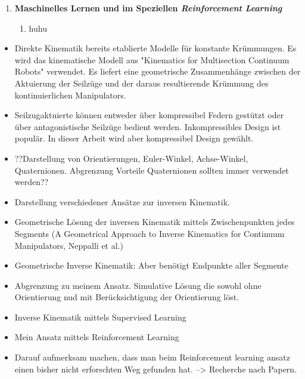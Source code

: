 \begin{enumerate}
\begin{enumerate}
\end{enumerate}
\item \textbf{Maschinelles Lernen und im Speziellen \textit{Reinforcement Learning}}
\begin{enumerate}
\item huhu
\end{enumerate}

\end{enumerate}

\begin{itemize}

\item Direkte Kinematik bereits etablierte Modelle für konstante Krümmungen. Es wird das kinematische Modell aus "Kinematics for Multisection Continuum Robots" verwendet. Es liefert eine geometrische Zusammenhänge zwischen der Aktuierung der Seilzüge und der daraus resultierende Krümmung des kontinuierlichen Manipulators.

\item Seilzugaktuierte können entweder über kompressibel Federn gestützt oder über antagonistische Seilzüge bedient werden. Inkompressibles Design ist populär. In dieser Arbeit wird aber kompressibel Design gewählt.

\item ??Darstellung von Orientierungen, Euler-Winkel, Achse-Winkel, Quaternionen. Abgrenzung Vorteile Quaternionen sollten immer verwendet werden??

\item Darstellung verschiedener Ansätze zur inversen Kinematik. 

\item Geometrische Lösung der inversen Kinematik mittels Zwischenpunkten jedes Segments (A Geometrical Approach to Inverse Kinematics for Continuum Manipulators, Neppalli et al.) \cite{NCJW09}

\item Geometrische Inverse Kinematik: Aber benötigt Endpunkte aller Segmente

\item Abgrenzung zu meinem Ansatz. Simulative Lösung die sowohl ohne Orientierung nud mit Berücksichtigung der Orientierung löst. 

\item Inverse Kinematik mittels Supervised Learning

\item Mein Ansatz mittels Reinforcement Learning

\item Darauf aufmerksam machen, dass man beim Reinforcement learning ansatz einen bisher nicht erforschten Weg gefunden hat. --> Recherche nach Papern. 


\end{itemize}
